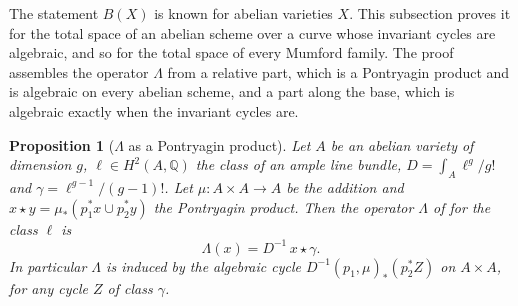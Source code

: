 \documentclass[11pt,reqno]{amsart}
\theoremstyle{plain}
\newtheorem{proposition}[theorem]{Proposition}
\theoremstyle{definition}
\theoremstyle{remark}
\newcommand{\QQ}{\mathbb{Q}}
\begin{document}
The statement $B(X)$ is known for abelian varieties $X$. This subsection
proves it for the total space
of an abelian scheme over a curve whose invariant cycles are algebraic, and
so for the total space of every Mumford family. The proof assembles the
operator $\Lambda$ from a relative part, which is a Pontryagin product and is
algebraic on every abelian scheme, and a part along the base, which is
algebraic exactly when the invariant cycles are.

\begin{proposition}[$\Lambda$ as a Pontryagin product]
\label{prop:pontryaginlambda}
Let $A$ be an abelian variety of dimension $g$, $\ell\in H^{2}(A,\QQ)$ the
class of an ample line bundle, $D=\int_{A}\ell^{g}/g!$ and
$\gamma=\ell^{g-1}/(g-1)!$. Let $\mu\colon A\times A\to A$ be the addition
and $x\star y=\mu_{*}(p_{1}^{*}x\cup p_{2}^{*}y)$ the Pontryagin product.
Then the operator $\Lambda$ of \cite[Definition~10.6]{paperI} for the class $\ell$ is
\[
  \Lambda(x)=D^{-1}\,x\star\gamma .
\]
In particular $\Lambda$ is induced by the algebraic cycle
$D^{-1}(p_{1},\mu)_{*}(p_{2}^{*}Z)$ on $A\times A$, for any cycle $Z$ of
class $\gamma$.
\end{proposition}
\end{document}
